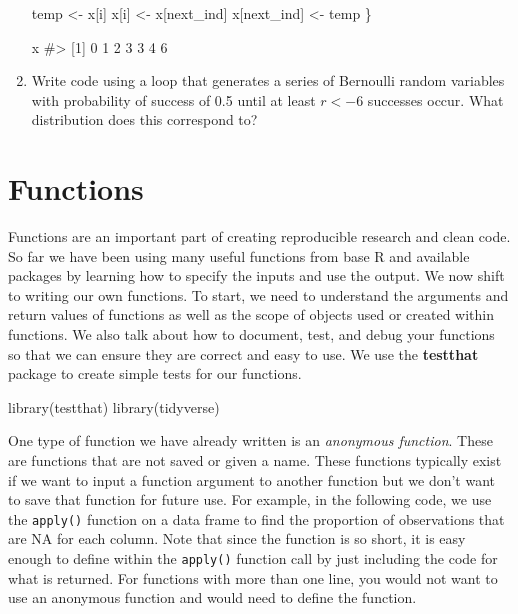 \documentclass[
  letterpaper,
]{latex/krantz}
\makeatletter
\newenvironment{Shaded}{\begin{snugshade}}{\end{snugshade}}
\newcommand{\CommentTok}[1]{\textcolor[rgb]{0.37,0.37,0.37}{#1}}
\newcommand{\FunctionTok}[1]{\textcolor[rgb]{0.28,0.35,0.67}{#1}}
\newcommand{\NormalTok}[1]{\textcolor[rgb]{0.00,0.23,0.31}{#1}}
\newcommand{\OtherTok}[1]{\textcolor[rgb]{0.00,0.23,0.31}{#1}}
\newenvironment{kframe}{%
\medskip{}
\setlength{\fboxsep}{.8em}
 \def\at@end@of@kframe{}%
 \ifinner\ifhmode%
  \def\at@end@of@kframe{\end{minipage}}%
  \begin{minipage}{\columnwidth}%
 \fi\fi%
 \def\FrameCommand##1{\hskip\@totalleftmargin \hskip-\fboxsep
 \colorbox{shadecolor}{##1}\hskip-\fboxsep
     \hskip-\linewidth \hskip-\@totalleftmargin \hskip\columnwidth}%
 \MakeFramed {\advance\hsize-\width
   \@totalleftmargin\z@ \linewidth\hsize
   \@setminipage}}%
 {\par\unskip\endMakeFramed%
 \at@end@of@kframe}
\renewenvironment{Shaded}{\begin{kframe}}{\end{kframe}}
\makeatother
\begin{document}
\begin{enumerate}
\begin{Shaded}
\begin{Highlighting}[]
\NormalTok{  temp }\OtherTok{\textless{}{-}}\NormalTok{ x[i]}
\NormalTok{  x[i] }\OtherTok{\textless{}{-}}\NormalTok{ x[next\_ind]}
\NormalTok{  x[next\_ind] }\OtherTok{\textless{}{-}}\NormalTok{ temp}
\NormalTok{\}}

\NormalTok{x }
\CommentTok{\#\textgreater{} [1] 0 1 2 3 3 4 6}
\end{Highlighting}
\end{Shaded}
\item
  Write code using a loop that generates a series of Bernoulli random
  variables with probability of success of 0.5 until at least \(r <- 6\)
  successes occur. What distribution does this correspond to?
\end{enumerate}

\chapter{Functions}\label{sec-functions}

Functions are an important part of creating reproducible research and
clean code. So far we have been using many useful functions from base R
and available packages by learning how to specify the inputs and use the
output. We now shift to writing our own functions. To start, we need to
understand the arguments and return values of functions as well as the
scope of objects used or created within functions. We also talk about
how to document, test, and debug your functions so that we can ensure
they are correct and easy to use. We use the \textbf{testthat}
package to create simple tests for our
functions.

\begin{Shaded}
\begin{Highlighting}[]
\FunctionTok{library}\NormalTok{(testthat)}
\FunctionTok{library}\NormalTok{(tidyverse)}
\end{Highlighting}
\end{Shaded}

One type of function we have already written is an \emph{anonymous
function}. These are functions that are not
saved or given a name. These functions typically exist if we want to
input a function argument to another function but we don't want to save
that function for future use. For example, in the following code, we use
the \texttt{apply()}
function on a data frame to find the proportion of observations that are
NA for each column. Note that since the function is so short, it is easy
enough to define within the \texttt{apply()} function call by just
including the code for what is returned. For functions with more than
one line, you would not want to use an anonymous function and would need
to define the function.
\end{document}
